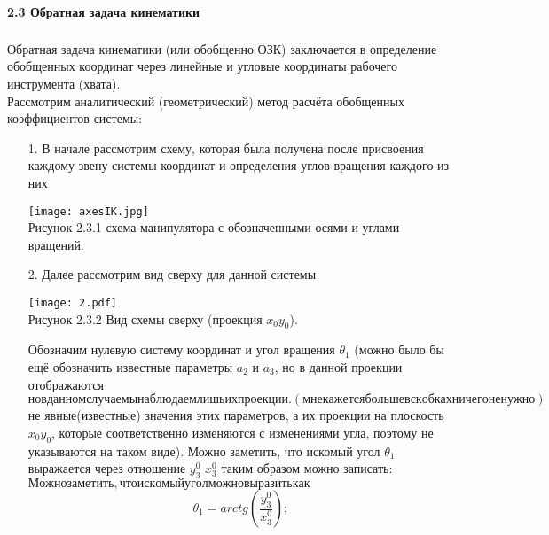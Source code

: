 \paragraph*{2.3 Обратная задача кинематики}$\phantom{-}$\\
\hspace*{\parindent}Обратная задача кинематики (или обобщенно ОЗК) заключается в определение обобщенных координат через линейные и угловые координаты рабочего инструмента (хвата). \\

\hspace*{\parindent}Рассмотрим аналитический (геометрический) метод расчёта обобщенных коэффициентов системы:\\
\begin{enumerate} 
\item[1.]  В начале рассмотрим схему, которая была получена после присвоения каждому звену системы координат и определения углов вращения каждого из них\\

\begin{center}
    \texttt{[image: axesIK.jpg]}\\
    Рисунок 2.3.1 схема манипулятора с обозначенными осями и углами вращений.\\
\end{center}

\item[2.] Далее рассмотрим вид сверху для данной системы\\

\begin{center}
    \texttt{[image: 2.pdf]}\\
     Рисунок 2.3.2 Вид схемы сверху (проекция $x_0 y_0$).\\
\end{center}


Обозначим нулевую систему координат и угол вращения $\theta_1$ (можно было бы ещё обозначить известные параметры $a_2$ и  $a_3$, но в данной проекции отображаются $но в данном случае мы наблюдаем лишь их проекции. (мне кажется больше в скобках ничего не нужно)$не явные(известные) значения этих параметров, а их проекции на плоскость $x_0 y_0$, которые соответственно изменяются с изменениями угла, поэтому не указываются на таком виде). Можно заметить, что искомый угол $\theta_1$ выражается через отношение $y_3^0$ $x_3^0$ таким образом можно записать:$Можно заметить, что искомый угол можно выразить как$\\
$$\theta_1=arctg(\frac{y_3^0}{x_3^0});$$


\end{enumerate}
